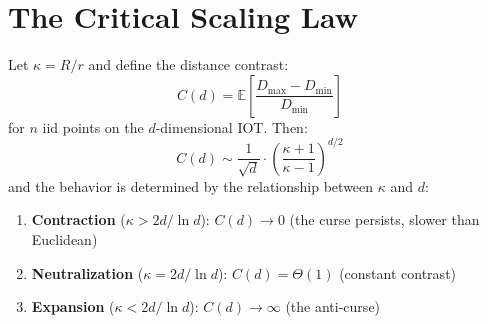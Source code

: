 \section{The Critical Scaling Law}
\label{sec:critical_scaling}

\begin{theorem}
\label{thm:critical_scaling}
Let $\kappa = R/r$ and define the distance contrast:
\begin{equation}
    C(d) = \mathbb{E}\!\left[\frac{D_{\max} - D_{\min}}{D_{\min}}\right]
\end{equation}
for $n$ iid points on the $d$-dimensional IOT. Then:
\begin{equation}
    C(d) \sim \frac{1}{\sqrt{d}} \cdot \left(\frac{\kappa + 1}{\kappa - 1}\right)^{d/2}
    \label{eq:contrast}
\end{equation}
and the behavior is determined by the relationship between $\kappa$ and $d$:

\begin{enumerate}
    \item \textbf{Contraction} ($\kappa > 2d/\ln d$): $C(d) \to 0$ (the curse persists, slower than Euclidean)
    \item \textbf{Neutralization} ($\kappa = 2d/\ln d$): $C(d) = \Theta(1)$ (constant contrast)
    \item \textbf{Expansion} ($\kappa < 2d/\ln d$): $C(d) \to \infty$ (the anti-curse)
\end{enumerate}
\end{theorem}

